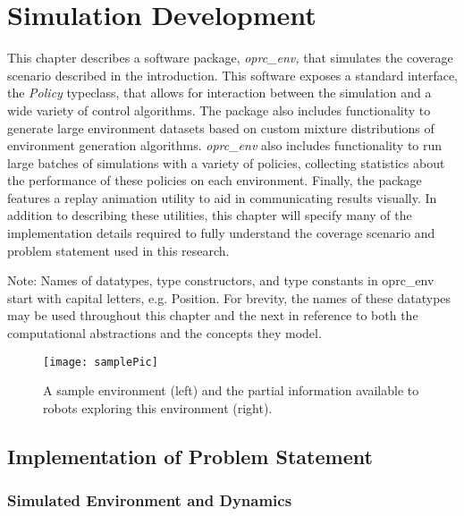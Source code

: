 \chapter{Simulation Development}

This chapter describes a software package, \textit{oprc\_env,} that simulates the coverage scenario described in the introduction. This software exposes a standard interface, the \textit{Policy} typeclass, that allows for interaction between the simulation and a wide variety of control algorithms. The package also includes functionality to generate large environment datasets based on custom mixture distributions of environment generation algorithms. \textit{oprc\_env} also includes functionality to run large batches of simulations with a variety of policies, collecting statistics about the performance of these policies on each environment. Finally, the package features a replay animation utility to aid in communicating results visually. In addition to describing these utilities, this chapter will specify many of the implementation details required to fully understand the coverage scenario and problem statement used in this research.


Note: Names of datatypes, type constructors, and type constants in oprc\_env start with capital letters, e.g. Position. For brevity, the names of these datatypes may be used throughout this chapter and the next in reference to both the computational abstractions and the concepts they model.


\begin{figure}[H]
\texttt{[image: samplePic]}
\caption[Sample Environment Visualization]{A sample environment (left) and the partial information available to robots exploring this environment (right).}
\label {fig:SampleViz}
\end{figure}

\section{Implementation of Problem Statement}

\subsection{Simulated Environment and Dynamics}

